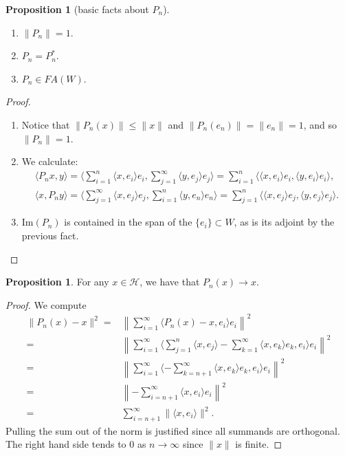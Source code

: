 \documentclass{dcthesis}
\numberwithin{equation}{section}
\numberwithin{equation}{section}
\theoremstyle{definition}
\newtheorem{proposition}[equation]{Proposition}
\begin{document}
\begin{proposition}[basic facts about $P_n$]
\label{prop_pn_basic_facts}
	\hfill
	\begin{enumerate}
		\item $\|P_n\|=1$.
		\item $P_n=P_n^\ast$.
		\item $P_n\in FA(W)$.
	\end{enumerate}
\end{proposition}
\begin{proof}
	\hfill
	\begin{enumerate}
		\item Notice that $\|P_n(x)\|\leq \|x\|$ and $\|P_n(e_n)\|=\|e_n\|=1$, and so $\|P_n\|=1$.
		\item We calculate:
			\begin{gather*}
				\langle P_nx,y \rangle =\langle \sum_{i=1}^n \langle x,e_i \rangle e_i,\sum_{j=1}^\infty \langle y,e_j \rangle e_j \rangle  = \sum_{i=1}^n \langle \langle x,e_i \rangle e_i, \langle y,e_i \rangle e_i \rangle, \\
				\langle x,P_ny \rangle = \langle \sum_{j=1}^\infty \langle x,e_j \rangle e_j,\sum_{i=1}^n \langle y,e_n \rangle e_n \rangle =\sum_{j=1}^n \langle \langle x,e_j \rangle e_j, \langle y,e_j \rangle e_j \rangle .
			\end{gather*}
		\item $\text{Im}(P_n)$ is contained in the span of the $\{e_i\}\subset W$, as is its adjoint by the previous fact.
	\end{enumerate}
\end{proof}


\begin{proposition}
	For any $x\in \mathcal{H}$, we have that $P_n(x)\to x$. 	
\end{proposition}
\begin{proof}
	We compute
	\begin{align}
		\|P_n(x) - x\|^2=& \left\|\sum_{i=1}^\infty \langle P_n(x) - x, e_i \rangle e_i\right\|^2 \nonumber \\
		=& \left\| \sum_{i=1}^\infty \langle \sum_{j=1}^n \langle x, e_j \rangle - \sum_{k=1}^\infty \langle x, e_k \rangle e_k, e_i \rangle e_i \right\|^2 \nonumber \\
		=& \left\|\sum_{i=1}^\infty \langle -\sum_{k=n+1}^\infty \langle x,e_k \rangle e_k,e_i \rangle e_i \right\|^2 \nonumber \\
		=& \left\|-\sum_{i=n+1}^\infty \langle x,e_i \rangle e_i\right\|^2 \nonumber \\
		\label{eq_pnx_minus_x_squared}
		=& \sum_{i=n+1}^\infty \|\langle x,e_i \rangle \|^2.
	\end{align}
	Pulling the sum out of the norm is justified since all summands are orthogonal. The right hand side tends to 0 as $n\to \infty$ since $\|x\|$ is finite.
\end{proof}
\end{document}
